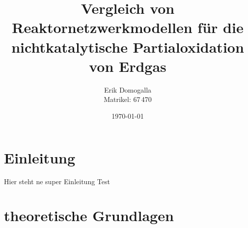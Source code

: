 \documentclass[footmark=none]{tubaf-thesis}
\title{Vergleich von Reaktornetzwerkmodellen für die nichtkatalytische Partialoxidation von Erdgas}
\author{Erik Domogalla\\{\small Matrikel: 67\,470}}
\date{\today}
\begin{document}

    \maketitle
    \tableofcontents
    \listoffigures
    
    \clearpage
    \chapter{Einleitung}
        Hier steht ne super Einleitung Test
\chapter{theoretische Grundlagen}
\end{document}
